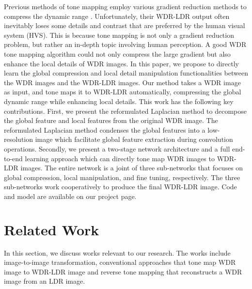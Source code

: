 \documentclass[journal]{IEEEtran}
\begin{document}
Previous methods of tone mapping employ various gradient reduction methods to compress the dynamic range \cite{fattal2002gradient,durand2002fast,reinhard2005dynamic,paris2015local,gu2013local}. Unfortunately, their WDR-LDR output often inevitably loses some details and contrast that are preferred by the human visual system (HVS). 
This is because tone mapping is not only a gradient reduction problem, but rather an in-depth topic involving human perception. A good WDR tone mapping algorithm could not only compress the large gradient but also enhance the local details of WDR images. In this paper, we propose to directly learn the global compression and local detail manipulation functionalities between the WDR images and the WDR-LDR images. Our method takes a WDR image as input, and tone maps it to WDR-LDR automatically, compressing the global dynamic range while enhancing local details. This work has the following key contributions. First, we present the reformulated Laplacian method to decompose the global feature and local features from the original WDR image. The reformulated Laplacian method condenses the global features into a low-resolution image which facilitate global feature extraction during convolution operations. Secondly, we present a two-stage network architecture and a full end-to-end learning approach which can directly tone map WDR images to WDR-LDR images. The entire network is a joint of three sub-networks that focuses on global compression, local manipulation, and fine tuning, respectively. The three sub-networks work cooperatively to produce the final WDR-LDR image. Code and model are available on our project page.

\section{Related Work}
In this section, we discuss works relevant to our research. The works include image-to-image transformation, conventional approaches that tone map WDR image to WDR-LDR image and reverse tone mapping that reconstructs a WDR image from an LDR image.

\end{document}
